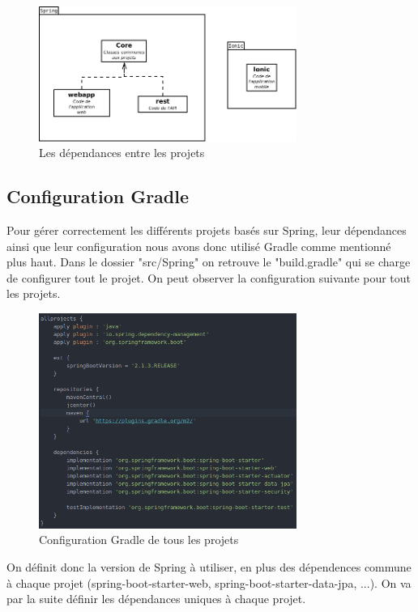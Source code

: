 			\begin{figure}[H]
				\centering\includegraphics[width=0.75\textwidth, keepaspectratio]{res/diag_projet.png}
				\caption{Les dépendances entre les projets}
			\end{figure}

		\subsection{Configuration Gradle}

			Pour gérer correctement les différents projets basés sur Spring, leur dépendances ainsi que leur configuration nous avons donc utilisé Gradle comme mentionné plus haut. Dans le dossier "src/Spring" on retrouve le "build.gradle" qui se charge de configurer tout le projet. On peut observer la configuration suivante pour tout les projets.

			\begin{figure}[H]
				\centering\includegraphics[width=0.75\textwidth, keepaspectratio]{res/gradle_allprojects.png}
				\caption{Configuration Gradle de tous les projets}
			\end{figure}

			On définit donc la version de Spring à utiliser, en plus des dépendences commune à chaque projet (spring-boot-starter-web, spring-boot-starter-data-jpa, ...). On va par la suite définir les dépendances uniques à chaque projet.

